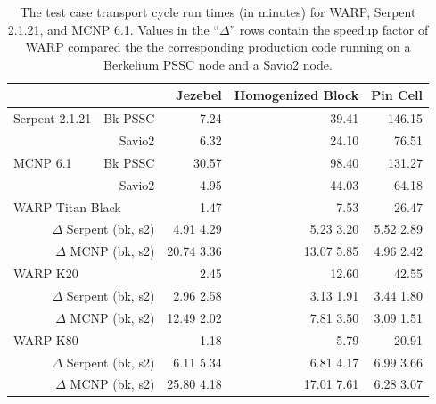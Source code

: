\documentclass[preprint,12pt]{elsarticle}
\begin{document}
\begin{table}[h]
\centering
\caption{The test case transport cycle run times (in minutes) for WARP, Serpent 2.1.21, and MCNP 6.1.  Values in the ``$\Delta$'' rows contain the speedup factor of WARP compared the the corresponding production code running on a Berkelium PSSC node and a Savio2 node.}
\label{results_table_times}
\scriptsize
\begin{tabular}{| l r | r | r | r |}
\cline{3-5}
\multicolumn{2}{c|}{}                            & Jezebel     & Homogenized Block & Pin Cell     \\
\hline                          
Serpent 2.1.21   &    Bk PSSC                    & 7.24        & 39.41             & 146.15       \\
                 &    Savio2                     & 6.32        & 24.10             & 76.51        \\
\hline                                        
MCNP 6.1         &    Bk PSSC                    &  30.57      & 98.40             & 131.27       \\
                 &    Savio2                     &   4.95      & 44.03             & 64.18        \\
\hline                          
\multicolumn{2}{|l|}{WARP Titan Black}           &  1.47       & 7.53              &  26.47       \\
\multicolumn{2}{|r|}{$\Delta$ Serpent (bk, s2)}  & 4.91  4.29  & 5.23  3.20        &  5.52  2.89  \\
\multicolumn{2}{|r|}{$\Delta$ MCNP    (bk, s2)}  & 20.74 3.36  & 13.07 5.85        &  4.96  2.42  \\
\hline
\multicolumn{2}{|l|}{WARP K20}                   & 2.45         & 12.60            & 42.55        \\
\multicolumn{2}{|r|}{$\Delta$ Serpent (bk, s2)}  & 2.96  2.58   & 3.13  1.91       & 3.44  1.80   \\
\multicolumn{2}{|r|}{$\Delta$ MCNP    (bk, s2)}  & 12.49 2.02   & 7.81  3.50       & 3.09  1.51   \\
\hline
\multicolumn{2}{|l|}{WARP K80}                   & 1.18         & 5.79             & 20.91        \\
\multicolumn{2}{|r|}{$\Delta$ Serpent (bk, s2)}  & 6.11  5.34   & 6.81  4.17       & 6.99  3.66   \\
\multicolumn{2}{|r|}{$\Delta$ MCNP    (bk, s2)}  & 25.80 4.18   & 17.01 7.61       & 6.28  3.07   \\
\hline
\end{tabular}


\end{table}
\end{document}
